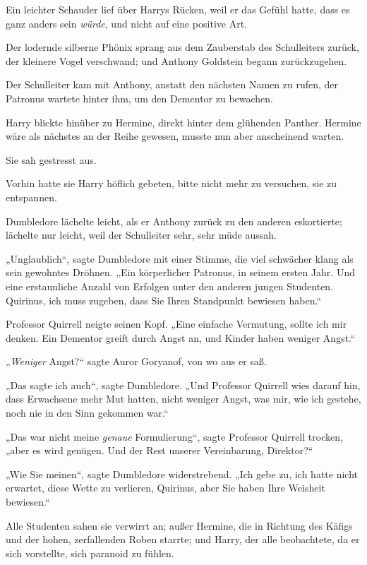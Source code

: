 {Ein leichter Schauder lief über Harrys Rücken, weil er das Gefühl hatte, dass es ganz anders sein \emph{würde}, und nicht auf eine positive Art.

Der lodernde silberne Phönix sprang aus dem Zauberstab des Schulleiters zurück, der kleinere Vogel verschwand; und Anthony Goldstein begann zurückzugehen.

Der Schulleiter kam mit Anthony, anstatt den nächsten Namen zu rufen, der Patronus wartete hinter ihm, um den Dementor zu bewachen.

Harry blickte hinüber zu Hermine, direkt hinter dem glühenden Panther. Hermine wäre als nächstes an der Reihe gewesen, musste nun aber anscheinend warten.

Sie sah gestresst aus.

Vorhin hatte sie Harry höflich gebeten, bitte nicht mehr zu versuchen, sie zu entspannen.

Dumbledore lächelte leicht, als er Anthony zurück zu den anderen eskortierte; lächelte nur leicht, weil der Schulleiter sehr, sehr müde aussah.

„Unglaublich“, sagte Dumbledore mit einer Stimme, die viel schwächer klang als sein gewohntes Dröhnen. „Ein körperlicher Patronus, in seinem ersten Jahr. Und eine erstaunliche Anzahl von Erfolgen unter den anderen jungen Studenten. Quirinus, ich muss zugeben, dass Sie Ihren Standpunkt bewiesen haben.“

Professor Quirrell neigte seinen Kopf. „Eine einfache Vermutung, sollte ich mir denken. Ein Dementor greift durch Angst an, und Kinder haben weniger Angst.“

„\emph{Weniger} Angst?“ sagte Auror Goryanof, von wo aus er saß.

„Das sagte ich auch“, sagte Dumbledore. „Und Professor Quirrell wies darauf hin, dass Erwachsene mehr Mut hatten, nicht weniger Angst, was mir, wie ich gestehe, noch nie in den Sinn gekommen war.“

„Das war nicht meine \emph{genaue} Formulierung“, sagte Professor Quirrell trocken, „aber es wird genügen. Und der Rest unserer Vereinbarung, Direktor?“

„Wie Sie meinen“, sagte Dumbledore widerstrebend. „Ich gebe zu, ich hatte nicht erwartet, diese Wette zu verlieren, Quirinus, aber Sie haben Ihre Weisheit bewiesen.“

Alle Studenten sahen sie verwirrt an; außer Hermine, die in Richtung des Käfigs und der hohen, zerfallenden Roben starrte; und Harry, der alle beobachtete, da er sich vorstellte, sich paranoid zu fühlen.

}
